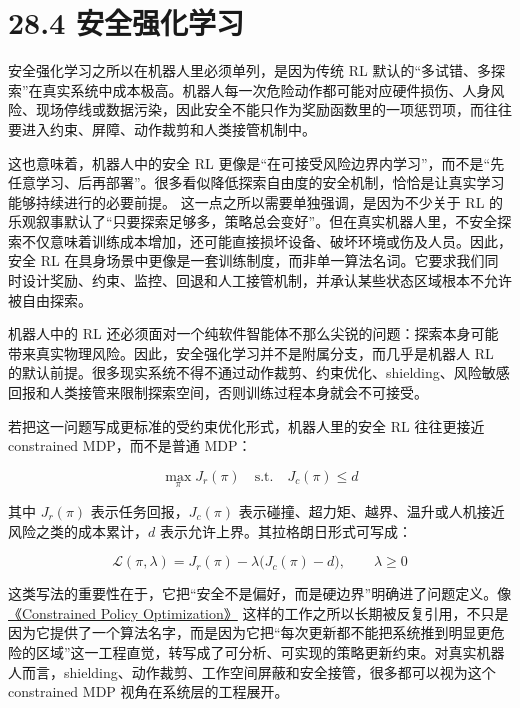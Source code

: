 \section*{28.4 安全强化学习}


安全强化学习之所以在机器人里必须单列，是因为传统 RL 默认的“多试错、多探索”在真实系统中成本极高。机器人每一次危险动作都可能对应硬件损伤、人身风险、现场停线或数据污染，因此安全不能只作为奖励函数里的一项惩罚项，而往往要进入约束、屏障、动作裁剪和人类接管机制中。

这也意味着，机器人中的安全 RL 更像是“在可接受风险边界内学习”，而不是“先任意学习、后再部署”。很多看似降低探索自由度的安全机制，恰恰是让真实学习能够持续进行的必要前提。 这一点之所以需要单独强调，是因为不少关于 RL 的乐观叙事默认了“只要探索足够多，策略总会变好”。但在真实机器人里，不安全探索不仅意味着训练成本增加，还可能直接损坏设备、破坏环境或伤及人员。因此，安全 RL 在具身场景中更像是一套训练制度，而非单一算法名词。它要求我们同时设计奖励、约束、监控、回退和人工接管机制，并承认某些状态区域根本不允许被自由探索。

机器人中的 RL 还必须面对一个纯软件智能体不那么尖锐的问题：探索本身可能带来真实物理风险。因此，安全强化学习并不是附属分支，而几乎是机器人 RL 的默认前提。很多现实系统不得不通过动作裁剪、约束优化、shielding、风险敏感回报和人类接管来限制探索空间，否则训练过程本身就会不可接受。

若把这一问题写成更标准的受约束优化形式，机器人里的安全 RL 往往更接近 constrained MDP，而不是普通 MDP：

\begingroup
\footnotesize
\begin{equation*}
\max_{\pi} J_r(\pi)
\quad \text{s.t.} \quad
J_c(\pi) \le d
\end{equation*}
\endgroup

其中 \(J_r(\pi)\) 表示任务回报，\(J_c(\pi)\) 表示碰撞、超力矩、越界、温升或人机接近风险之类的成本累计，\(d\) 表示允许上界。其拉格朗日形式可写成：

\begingroup
\footnotesize
\begin{equation*}
\mathcal{L}(\pi,\lambda)=J_r(\pi)-\lambda\bigl(J_c(\pi)-d\bigr), \qquad \lambda \ge 0
\end{equation*}
\endgroup

这类写法的重要性在于，它把“安全不是偏好，而是硬边界”明确进了问题定义。像 \href{https://arxiv.org/abs/1705.10528}{《Constrained Policy Optimization》} 这样的工作之所以长期被反复引用，不只是因为它提供了一个算法名字，而是因为它把“每次更新都不能把系统推到明显更危险的区域”这一工程直觉，转写成了可分析、可实现的策略更新约束。对真实机器人而言，shielding、动作裁剪、工作空间屏蔽和安全接管，很多都可以视为这个 constrained MDP 视角在系统层的工程展开。


